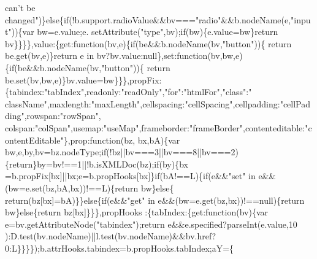 \begin{DoxyCode}
{       can't be changed"})\}\textcolor{keywordflow}{else}\{\textcolor{keywordflow}{if}(!b.support.radioValue&&bv===\textcolor{stringliteral}{"radio"}&&b.nodeName(e,\textcolor{stringliteral}{"input"}))\{var bw=e.value;e.
      setAttribute(\textcolor{stringliteral}{"type"},bv);\textcolor{keywordflow}{if}(bw)\{e.value=bw\}\textcolor{keywordflow}{return} bv\}\}\}\},value:\{\textcolor{keyword}{get}:\textcolor{keyword}{function}(bv,e)\{\textcolor{keywordflow}{if}(be&&b.nodeName(bv,\textcolor{stringliteral}{"button"}))\{\textcolor{keywordflow}{
      return} be.get(bv,e)\}\textcolor{keywordflow}{return} e in bv?bv.value:null\},set:\textcolor{keyword}{function}(bv,bw,e)\{\textcolor{keywordflow}{if}(be&&b.nodeName(bv,\textcolor{stringliteral}{"button"}))\{\textcolor{keywordflow}{
      return} be.set(bv,bw,e)\}bv.value=bw\}\}\},propFix:\{tabindex:\textcolor{stringliteral}{"tabIndex"},readonly:\textcolor{stringliteral}{"readOnly"},\textcolor{stringliteral}{"for"}:\textcolor{stringliteral}{"htmlFor"},\textcolor{stringliteral}{"class"}:\textcolor{stringliteral}{"
      className"},maxlength:\textcolor{stringliteral}{"maxLength"},cellspacing:\textcolor{stringliteral}{"cellSpacing"},cellpadding:\textcolor{stringliteral}{"cellPadding"},rowspan:\textcolor{stringliteral}{"rowSpan"},
      colspan:\textcolor{stringliteral}{"colSpan"},usemap:\textcolor{stringliteral}{"useMap"},frameborder:\textcolor{stringliteral}{"frameBorder"},contenteditable:\textcolor{stringliteral}{"contentEditable"}\},prop:\textcolor{keyword}{function}(bz,
      bx,bA)\{var bw,e,by,bv=bz.nodeType;\textcolor{keywordflow}{if}(!bz||bv===3||bv===8||bv===2)\{\textcolor{keywordflow}{return}\}by=bv!==1||!b.isXMLDoc(bz);\textcolor{keywordflow}{if}(by)\{bx
      =b.propFix[bx]||bx;e=b.propHooks[bx]\}\textcolor{keywordflow}{if}(bA!==L)\{\textcolor{keywordflow}{if}(e&&\textcolor{stringliteral}{"set"} in e&&(bw=e.set(bz,bA,bx))!==L)\{\textcolor{keywordflow}{return} bw\}\textcolor{keywordflow}{else}\{\textcolor{keywordflow}{
      return}(bz[bx]=bA)\}\}\textcolor{keywordflow}{else}\{\textcolor{keywordflow}{if}(e&&\textcolor{stringliteral}{"get"} in e&&(bw=e.get(bz,bx))!==null)\{\textcolor{keywordflow}{return} bw\}\textcolor{keywordflow}{else}\{\textcolor{keywordflow}{return} bz[bx]\}\}\},propHooks
      :\{tabIndex:\{\textcolor{keyword}{get}:\textcolor{keyword}{function}(bv)\{var e=bv.getAttributeNode(\textcolor{stringliteral}{"tabindex"});\textcolor{keywordflow}{return} e&&e.specified?parseInt(e.value,10
      ):D.test(bv.nodeName)||l.test(bv.nodeName)&&bv.href?0:L\}\}\}\});b.attrHooks.tabindex=b.propHooks.tabIndex;aY=\{\textcolor{keyword}{
}
\end{DoxyCode}
